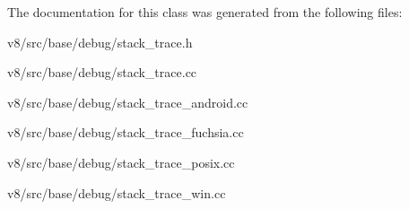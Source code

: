 The documentation for this class was generated from the following files\+:\begin{DoxyCompactItemize}
\item 
v8/src/base/debug/stack\+\_\+trace.\+h\item 
v8/src/base/debug/stack\+\_\+trace.\+cc\item 
v8/src/base/debug/stack\+\_\+trace\+\_\+android.\+cc\item 
v8/src/base/debug/stack\+\_\+trace\+\_\+fuchsia.\+cc\item 
v8/src/base/debug/stack\+\_\+trace\+\_\+posix.\+cc\item 
v8/src/base/debug/stack\+\_\+trace\+\_\+win.\+cc\end{DoxyCompactItemize}
